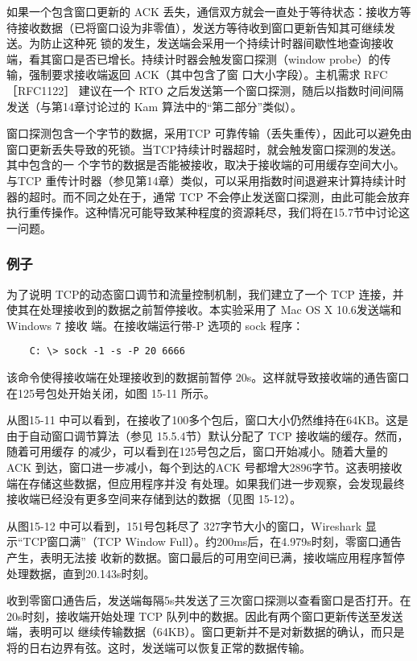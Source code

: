 如果一个包含窗口更新的 ACK 丢失，通信双方就会一直处于等待状态：接收方等待接收数据（已将窗口设为非零值），发送方等待收到窗口更新告知其可继续发送。为防止这种死
锁的发生，发送端会采用一个持续计时器间歇性地查询接收端，看其窗口是否已增长。持续计时器会触发窗口探测（window probe）的传输，强制要求接收端返回 ACK（其中包含了窗
口大小字段）。主机需求 RFC ［RFC1122］ 建议在一个 RTO 之后发送第一个窗口探测，随后以指数时间间隔发送（与第14章讨论过的 Kam 算法中的“第二部分”类似）。

窗口探测包含一个字节的数据，采用TCP 可靠传输（丢失重传），因此可以避免由窗口更新丢失导致的死锁。当TCP持续计时器超时，就会触发窗口探测的发送。其中包含的一
个字节的数据是否能被接收，取决于接收端的可用缓存空间大小。与TCP 重传计时器（参见第14章）类似，可以采用指数时间退避来计算持续计时器的超时。而不同之处在于，通常
TCP 不会停止发送窗口探测，由此可能会放弃执行重传操作。这种情况可能导致某种程度的资源耗尽，我们将在15.7节中讨论这一问题。

\subsubsection{例子}

为了说明 TCP的动态窗口调节和流量控制机制，我们建立了一个 TCP 连接，并使其在处理接收到的数据之前暂停接收。本实验采用了 Mac OS X 10.6发送端和 Windows 7 接收
端。在接收端运行带-P 选项的 sock 程序：
\begin{verbatim}
    C: \> sock -1 -s -P 20 6666
\end{verbatim}
该命令使得接收端在处理接收到的数据前暂停 20s。这样就导致接收端的通告窗口在125号包处开始关闭，如图 15-11 所示。

从图15-11 中可以看到，在接收了100多个包后，窗口大小仍然维持在64KB。这是由于自动窗口调节算法（参见 15.5.4节）默认分配了 TCP 接收端的缓存。然而，随着可用缓存
的减少，可以看到在125号包之后，窗口开始减小。随着大量的ACK 到达，窗口进一步减小，每个到达的ACK 号都增大2896字节。这表明接收端在存储这些数据，但应用程序并没
有处理。如果我们进一步观察，会发现最终接收端已经没有更多空间来存储到达的数据（见图 15-12）。

从图15-12 中可以看到，151号包耗尽了 327字节大小的窗口，Wireshark 显示“TCP窗口满”（TCP Window Full）。约200ms后，在4.979s时刻，零窗口通告产生，表明无法接
收新的数据。窗口最后的可用空间已满，接收端应用程序暂停处理数据，直到20.143s时刻。

收到零窗口通告后，发送端每隔5s共发送了三次窗口探测以查看窗口是否打开。在20s时刻，接收端开始处理 TCP 队列中的数据。因此有两个窗口更新传送至发送端，表明可以
继续传输数据（64KB）。窗口更新并不是对新数据的确认，而只是将的日右边界有弦。这时，发送端可以恢复正常的数据传输。

